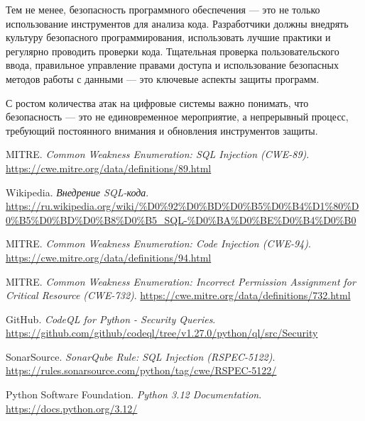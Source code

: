 \documentclass[a4paper,12pt]{article} %
\begin{document}
		\par Тем не менее, безопасность программного обеспечения — это не только использование инструментов для анализа кода. Разработчики должны внедрять культуру безопасного программирования, использовать лучшие практики и регулярно проводить проверки кода. Тщательная проверка пользовательского ввода, правильное управление правами доступа и использование безопасных методов работы с данными — это ключевые аспекты защиты программ.

		\par С ростом количества атак на цифровые системы важно понимать, что безопасность — это не единовременное мероприятие, а непрерывный процесс, требующий постоянного внимания и обновления инструментов защиты. 

	\begin{thebibliography}{10} %

    		MITRE. \textit{Common Weakness Enumeration: SQL Injection (CWE-89)}. 
    		\url{https://cwe.mitre.org/data/definitions/89.html}

    		Wikipedia. \textit{Внедрение SQL-кода}. 
    		\url{https://ru.wikipedia.org/wiki/%D0%92%D0%BD%D0%B5%D0%B4%D1%80%D0%B5%D0%BD%D0%B8%D0%B5_SQL-%D0%BA%D0%BE%D0%B4%D0%B0}

    		MITRE. \textit{Common Weakness Enumeration: Code Injection (CWE-94)}. 
    		\url{https://cwe.mitre.org/data/definitions/94.html}

    		MITRE. \textit{Common Weakness Enumeration: Incorrect Permission Assignment for Critical Resource (CWE-732)}.
    		\url{https://cwe.mitre.org/data/definitions/732.html}

    		GitHub. \textit{CodeQL for Python - Security Queries}. 
    		\url{https://github.com/github/codeql/tree/v1.27.0/python/ql/src/Security}

    		SonarSource. \textit{SonarQube Rule: SQL Injection (RSPEC-5122)}. 
    		\url{https://rules.sonarsource.com/python/tag/cwe/RSPEC-5122/} 

    		Python Software Foundation. \textit{Python 3.12 Documentation}. 
    		\url{https://docs.python.org/3.12/}

\end{thebibliography}
\end{document}
